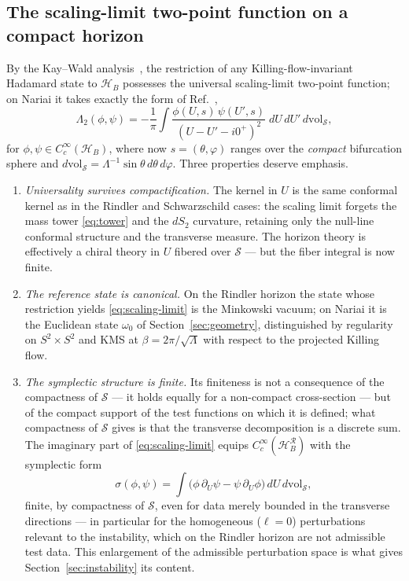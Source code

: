 \documentclass[11pt]{article}
\newcommand{\Nariai}{Nariai}
\begin{document}
\subsection{The scaling-limit two-point function on a compact horizon}

By the Kay--Wald analysis~\cite{KayWald}, the restriction of any Killing-flow-invariant Hadamard state to $\mathcal{H}_B$ possesses the universal scaling-limit two-point function; on \Nariai{} it takes exactly the form of Ref.~\cite{DorauMuch},
\begin{equation}
\Lambda_2(\phi, \psi)
= -\frac{1}{\pi} \int
\frac{\phi(U, s)\, \psi(U', s)}{(U - U' - i0^+)^2}\;
dU\, dU'\, d\mathrm{vol}_{\mathcal{S}},
\label{eq:scaling-limit}
\end{equation}
for $\phi, \psi \in C^\infty_c(\mathcal{H}_B)$, where now $s = (\theta,\varphi)$ ranges over the \emph{compact} bifurcation sphere and $d\mathrm{vol}_{\mathcal{S}} = \Lambda^{-1} \sin\theta\, d\theta\, d\varphi$. Three properties deserve emphasis.

\begin{enumerate}
\item \emph{Universality survives compactification.} The kernel in $U$ is the same conformal kernel as in the Rindler and Schwarzschild cases: the scaling limit forgets the mass tower \eqref{eq:tower} and the $dS_2$ curvature, retaining only the null-line conformal structure and the transverse measure. The horizon theory is effectively a chiral theory in $U$ fibered over $\mathcal{S}$ --- but the fiber integral is now finite.

\item \emph{The reference state is canonical.} On the Rindler horizon the state whose restriction yields \eqref{eq:scaling-limit} is the Minkowski vacuum; on \Nariai{} it is the Euclidean state $\omega_0$ of Section~\ref{sec:geometry}, distinguished by regularity on $S^2\times S^2$ and KMS at $\beta = 2\pi/\sqrt{\Lambda}$ with respect to the projected Killing flow.

\item \emph{The symplectic structure is finite.} Its finiteness is not a consequence of the compactness of $\mathcal{S}$ --- it holds equally for a non-compact cross-section --- but of the compact support of the test functions on which it is defined; what compactness of $\mathcal{S}$ gives is that the transverse decomposition is a discrete sum. The imaginary part of \eqref{eq:scaling-limit} equips $C^\infty_c(\mathcal{H}_B^{\mathcal{R}})$ with the symplectic form
\begin{equation}
\sigma(\phi,\psi)
= \int \big(\phi\,\partial_U \psi - \psi\,\partial_U \phi\big)\, dU\, d\mathrm{vol}_{\mathcal{S}},
\label{eq:symplectic}
\end{equation}
finite, by compactness of $\mathcal{S}$, even for data merely bounded in the transverse directions --- in particular for the homogeneous ($\ell = 0$) perturbations relevant to the instability, which on the Rindler horizon are not admissible test data. This enlargement of the admissible perturbation space is what gives Section~\ref{sec:instability} its content.

\end{enumerate}
\end{document}
